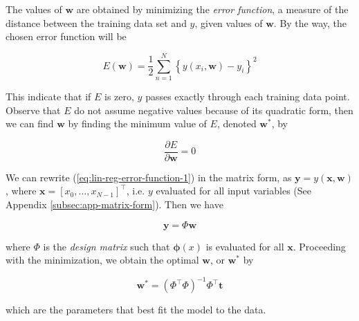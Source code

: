 \documentclass[11pt]{article} %
\begin{document}
The values of $\mathbf{w}$ are obtained by minimizing the \textit{error function}, a measure of the distance between the training data set and $y$, given values of $\mathbf{w}$. By the way, the chosen error function will be 

\begin{equation}
   \label{eq:lin-reg-error-function-1}
   E(\mathbf{w}) = \frac{1}{2} \sum_{n=1}^N \left\{ y(x_i,\mathbf{w})-y_i \right\}^2
\end{equation}

This indicate that if $E$ is zero, $y$ passes exactly through each training data point. Observe that $E$ do not assume negative values because of its quadratic form, then we can find $\mathbf{w}$ by finding the minimum value of $E$, denoted $\mathbf{w^*}$, by

\begin{equation}
   \frac{\partial E}{\partial \mathbf{w}} = 0
\end{equation}

We can rewrite (\ref{eq:lin-reg-error-function-1}) in the matrix form, as $\mathbf{y} = y(\mathbf{x},\mathbf{w})$, where $\mathbf{x}=\left[ x_0,\dots, x_{N-1} \right]^\top$, i.e. $y$ evaluated for all input variables (See Appendix \ref{subsec:app-matrix-form}). Then we have

\begin{equation}
   \label{eq:lin-reg-error-function-matrix-form}
   \mathbf{y} = \Phi \mathbf{w}
\end{equation}

where $\Phi$ is the \textit{design matrix} such that $\boldsymbol{\phi}(x)$ is evaluated for all $\mathbf{x}$. Proceeding with the minimization, we obtain the optimal $\mathbf{w}$, or $\mathbf{w}^*$ by

\begin{equation}
   \label{eq:lin-reg-opt-param}
   \mathbf{w}^{*} = (\Phi^\top \Phi)^{-1}\Phi^\top \mathbf{t}
\end{equation}

which are the parameters that best fit the model to the data.
\end{document}
